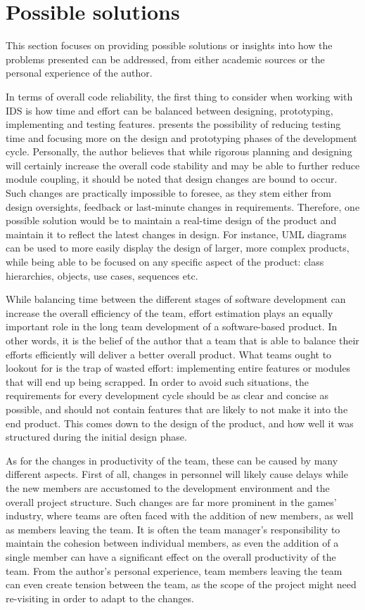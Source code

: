 \documentclass{scrartcl}
\begin{document}
    \section{Possible solutions}
    
    This section focuses on providing possible solutions or insights into how the problems presented can be addressed, from either academic sources or the personal experience of the author.
    
    In terms of overall code reliability, the first thing to consider when working with IDS is how time and effort can be balanced between designing, prototyping, implementing and testing features. \cite{Source9} presents the possibility of reducing testing time and focusing more on the design and prototyping phases of the development cycle. Personally, the author believes that while rigorous planning and designing will certainly increase the overall code stability and may be able to further reduce module coupling, it should be noted that design changes are bound to occur. Such changes are practically impossible to foresee, as they stem either from design oversights, feedback or last-minute changes in requirements. Therefore, one possible solution would be to maintain a real-time design of the product and maintain it to reflect the latest changes in design. For instance, UML diagrams can be used to more easily display the design of larger, more complex products, while being able to be focused on any specific aspect of the product: class hierarchies, objects, use cases, sequences etc.
    
    While balancing time between the different stages of software development can increase the overall efficiency of the team, effort estimation plays an equally important role in the long team development of a software-based product. In other words, it is the belief of the author that a team that is able to balance their efforts efficiently will deliver a better overall product. What teams ought to lookout for is the trap of wasted effort: implementing entire features or modules that will end up being scrapped. In order to avoid such situations, the requirements for every development cycle should be as clear and concise as possible, and should not contain features that are likely to not make it into the end product. This comes down to the design of the product, and how well it was structured during the initial design phase.
    
    As for the changes in productivity of the team, these can be caused by many different aspects. First of all, changes in personnel will likely cause delays while the new members are accustomed to the development environment and the overall project structure. Such changes are far more prominent in the games' industry, where teams are often faced with the addition of new members, as well as members leaving the team. It is often the team manager's responsibility to maintain the cohesion between individual members, as even the addition of a single member can have a significant effect on the overall productivity of the team. From the author's personal experience, team members leaving the team can even create tension between the team, as the scope of the project might need re-visiting in order to adapt to the changes. 
    
\end{document}
